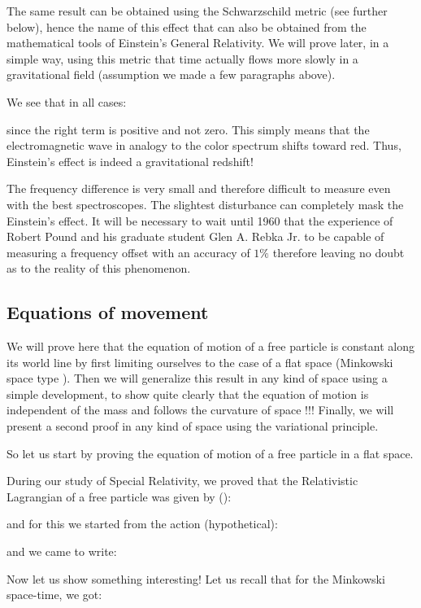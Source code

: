 	The same result can be obtained using the Schwarzschild metric (see further below), hence the name of this effect that can also be obtained from the mathematical tools of Einstein's General Relativity. We will prove later, in a simple way, using this metric that time actually flows more slowly in a gravitational field (assumption we made a few paragraphs above).
	
	We see that in all cases:
	
	since the right term is positive and not zero. This simply means that the electromagnetic wave in analogy to the color spectrum shifts toward red. Thus, Einstein's effect is indeed a gravitational redshift!

	The frequency difference is very small and therefore difficult to measure even with the best spectroscopes. The slightest disturbance can completely mask the Einstein's effect. It will be necessary to wait until 1960 that the experience of Robert Pound and his graduate student Glen A. Rebka Jr. to be capable of measuring a frequency offset with an accuracy of $1\%$ therefore leaving no doubt as to the reality of this phenomenon.
	
	\subsection{Equations of movement}
	We will prove here that the equation of motion of a free particle is constant along its world line by first limiting ourselves to the case of a flat space (Minkowski space type ). Then we will generalize this result in any kind of space using a simple development, to show quite clearly that the equation of motion is independent of the mass and follows the curvature of space !!! Finally, we will present a second proof in any kind of space using the variational principle.

	So let us start by proving the equation of motion of a free particle in a flat space.

	During our study of Special Relativity, we proved that the Relativistic Lagrangian of a free particle was given by ():
	
	and for this we started from the action (hypothetical):
	
	and we came to write:
	
	Now let us show something interesting! Let us recall that for the Minkowski space-time, we got:
	
